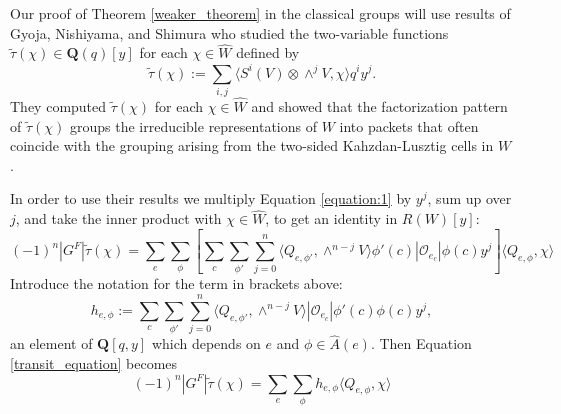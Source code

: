 \documentclass[10pt]{amsart}
\newcommand{\qq}{\mathbf Q}
\newcommand{\orbit}{\mathcal O}
\renewcommand{\wr}{\hat{W}}
\newcommand{\ar}{{\hat{A}}(e)}
\newcommand{\ttau}{\tilde{\tau}}
\theoremstyle{plain}
\theoremstyle{definition}
\theoremstyle{remark}
\begin{document}
Our proof of Theorem \ref{weaker_theorem} in the classical groups will use results of Gyoja, Nishiyama, and Shimura \cite{gyoja:invariants1}
who studied the two-variable functions $\ttau(\chi) \in \qq(q)[y]$ for each $\chi \in \wr$   
defined by 
$$\ttau(\chi) :=  \sum_{i, j} \langle S^i(V) \otimes \wedge^j V, \chi \rangle q^i y^j.$$
They computed $\ttau(\chi)$ for each $\chi \in \wr$ and showed that the factorization pattern of $\ttau(\chi)$ groups the irreducible
representations of $W$ into packets that often coincide with the grouping 
arising from the  two-sided Kahzdan-Lusztig cells in $W$.   

In order to use their results we 
multiply Equation \ref{equation:1} by $y^j$, sum up over $j$, and take the inner product with $\chi \in \wr$, to get
an identity in $R(W)[y]$:
\begin{equation}  \label{transit_equation}
(-1)^n |G^F| \ttau(\chi) =   \sum_{e}  \sum_{\phi} \left[ \sum_c  \sum_{\phi'} \sum^n_{j=0} \langle Q_{e, \phi'}, \wedge^{n-j} V \rangle  \phi'(c) |\orbit_{e_c}|   \phi(c) y^j \right]  \langle Q_{e, \phi}, \chi \rangle 
\end{equation}
Introduce the notation for the term in brackets above:
\begin{equation} \label{h_equation}
h_{e, \phi} := \sum_c  \sum_{\phi'} \sum^n_{j=0} \langle Q_{e, \phi'}, \wedge^{n-j} V \rangle  |\orbit_{e_c}|  \phi'(c) \phi(c) y^j ,
\end{equation}
an element of $\qq[q,y]$ which depends on $e$ and $\phi \in \ar$.
Then Equation \ref{transit_equation} becomes
\begin{equation}  \label{Main_equation}
(-1)^n |G^F| \ttau(\chi) =   \sum_{e}  \sum_{\phi} h_{e, \phi} \langle Q_{e, \phi}, \chi \rangle 
\end{equation}


\end{document}
